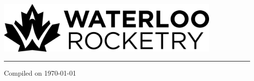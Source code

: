 \begin{center}
\vspace*{7cm}
\hspace{7em}\includegraphics[width=30em]{common/mono_horizontal_standard}
\newline
\rule{50em}{2pt}

\vspace{1cm}
\thetitle

\vspace*{\fill}
Compiled on \today
\end{center}
\newpage
